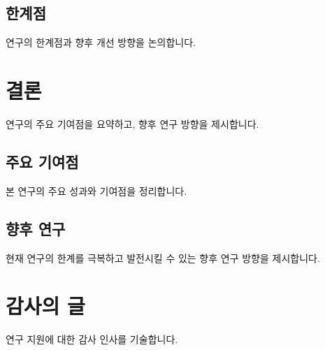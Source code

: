 \documentclass[12pt,a4paper]{article}
\begin{document}
\subsection{한계점}
연구의 한계점과 향후 개선 방향을 논의합니다.

\section{결론}
\label{sec:conclusion}

연구의 주요 기여점을 요약하고, 향후 연구 방향을 제시합니다.

\subsection{주요 기여점}
본 연구의 주요 성과와 기여점을 정리합니다.

\subsection{향후 연구}
현재 연구의 한계를 극복하고 발전시킬 수 있는 향후 연구 방향을 제시합니다.

\section*{감사의 글}
연구 지원에 대한 감사 인사를 기술합니다.



\end{document}
